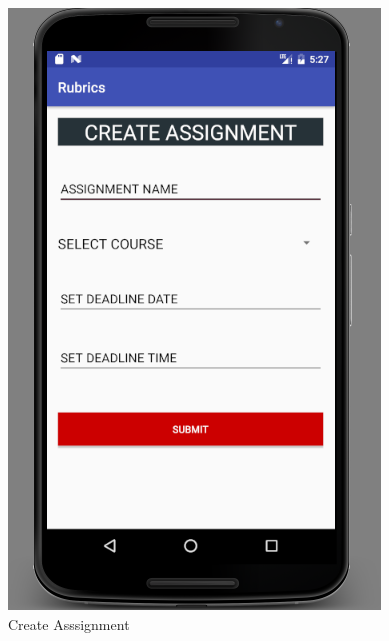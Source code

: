 \begin{figure}[!h]
\begin{minipage}[t]{0.5\linewidth}
    \centering
\hfill\includegraphics[scale=.65]{project/images/createassigmentnew}\hspace*{\fill}
    \caption{Create Asssignment}
    \label{f1}
\end{minipage}
\hspace{0.1cm}
\begin{minipage}[t]{0.5\linewidth} 
    \centering

\end{minipage}
\end{figure}
